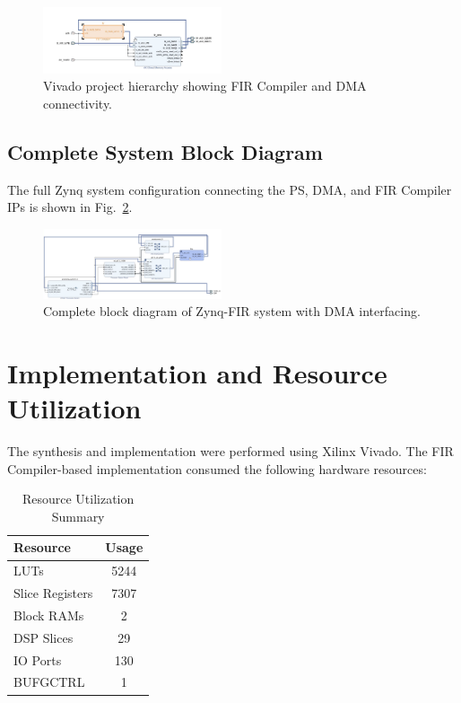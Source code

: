 \documentclass[conference]{IEEEtran}
\begin{document}
	\begin{figure}[htbp]
		\centerline{\includegraphics[width=0.47\textwidth]{Heirarchy.png}}
		\caption{Vivado project hierarchy showing FIR Compiler and DMA connectivity.}
		\label{fig_hier}
	\end{figure}
	
	\subsection{Complete System Block Diagram}
	The full Zynq system configuration connecting the PS, DMA, and FIR Compiler IPs is shown in Fig.~\ref{fig_fullblock}.
	
	\begin{figure}[htbp]
		\centerline{\includegraphics[width=0.47\textwidth]{complete_block_diagram.png}}
		\caption{Complete block diagram of Zynq-FIR system with DMA interfacing.}
		\label{fig_fullblock}
	\end{figure}
	
	\section{Implementation and Resource Utilization}
	The synthesis and implementation were performed using Xilinx Vivado. The FIR Compiler-based implementation consumed the following hardware resources:
	
	\begin{table}[htbp]
		\caption{Resource Utilization Summary}
		\begin{center}
			\begin{tabular}{|l|c|}
				\hline
				\textbf{Resource} & \textbf{Usage} \\
				\hline
				LUTs & 5244 \\
				Slice Registers & 7307 \\
				Block RAMs & 2 \\
				DSP Slices & 29 \\
				IO Ports & 130 \\
				BUFGCTRL & 1 \\
				\hline
			\end{tabular}
			\label{tab_resources}
		\end{center}
	\end{table}
	
\end{document}

